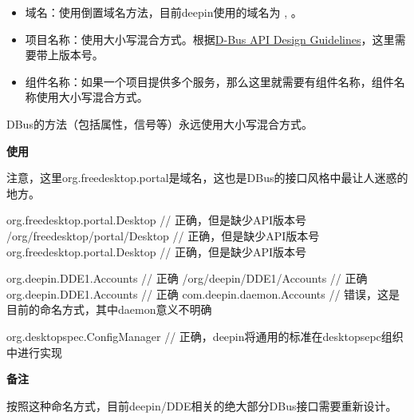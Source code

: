 \begin{itemize}
  \item 域名：使用倒置域名方法，目前deepin使用的域名为 ,  。
  \item 项目名称：使用大小写混合方式。根据\href{https://dbus.freedesktop.org/doc/dbus-api-design.html}{D-Bus API Design Guidelines}，这里需要带上版本号。
  \item 组件名称：如果一个项目提供多个服务，那么这里就需要有组件名称，组件名称使用大小写混合方式。
\end{itemize}

DBus的方法（包括属性，信号等）永远使用大小写混合方式。

\textbf{使用}

注意，这里org.freedesktop.portal是域名，这也是DBus的接口风格中最让人迷惑的地方。

\begin{cppcode}
  org.freedesktop.portal.Desktop      // 正确，但是缺少API版本号
  /org/freedesktop/portal/Desktop     // 正确，但是缺少API版本号
  org.freedesktop.portal.Desktop      // 正确，但是缺少API版本号
\end{cppcode}

\begin{cppcode}
  org.deepin.DDE1.Accounts       // 正确
  /org/deepin/DDE1/Accounts      // 正确
  org.deepin.DDE1.Accounts       // 正确
  com.deepin.daemon.Accounts     // 错误，这是目前的命名方式，其中daemon意义不明确

  org.desktopspec.ConfigManager  // 正确，deepin将通用的标准在desktopsepc组织中进行实现

\end{cppcode}


\textbf{备注}

按照这种命名方式，目前deepin/DDE相关的绝大部分DBus接口需要重新设计。